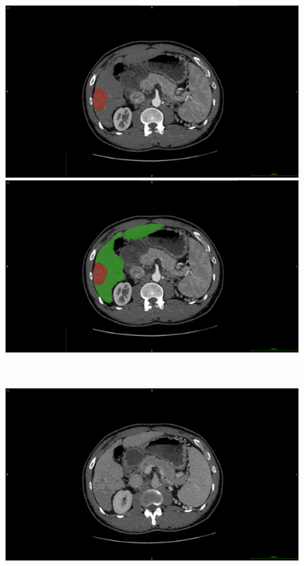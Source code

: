 \begin{figure}[ht!]
	\centering
	\begin{minipage}{0.45\linewidth}
		\includegraphics[width=\linewidth]{../HistologicalGradePrediction/images/GDB/GDB_Pat77_slice261_AR_TumorPred}
	\end{minipage} \hspace{-0.1cm}
	\begin{minipage}{0.45\linewidth}
		\includegraphics[width=\linewidth]{../HistologicalGradePrediction/images/GDB/GDB_Pat77_slice261_AR_liverTumorPred}
	\end{minipage} \\
	\begin{minipage}{0.45\linewidth}
	\includegraphics[width=\linewidth]{../HistologicalGradePrediction/images/GDB/GDB_Pat77_slice261_raw_PV}

\end{minipage}
\end{figure}
